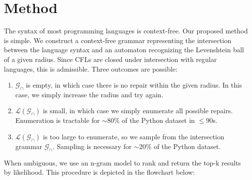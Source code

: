 \section{Method}

The syntax of most programming languages is context-free. Our proposed method is simple. We construct a context-free grammar representing the intersection between the language syntax and an automaton recognizing the Levenshtein ball of a given radius. Since CFLs are closed under intersection with regular languages, this is admissible. Three outcomes are possible:

\begin{enumerate}
  \item $\mathcal{G}_\cap$ is empty, in which case there is no repair within the given radius. In this case, we simply increase the radius and try again.
  \item $\mathcal{L}(\mathcal{G}_\cap)$ is small, in which case we simply enumerate all possible repairs. Enumeration is tractable for $\sim 80\%$ of the Python dataset in $\leq 90$s.
  \item $\mathcal{L}(\mathcal{G}_\cap)$ is too large to enumerate, so we sample from the intersection grammar $\mathcal{G}_\cap$. Sampling is necessary for $\sim20\%$ of the Python dataset.
\end{enumerate}

When ambiguous, we use an n-gram model to rank and return the top-k results by likelihood. This procedure is depicted in the flowchart below:

